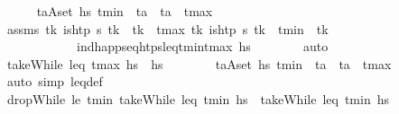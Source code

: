 \begin{isabellebody}
\isanewline
\ \ \ \ \isamarkupfalse%
\ {\isachardoublequoteopen}{\isasymforall}{\isacharparenleft}{\kern0pt}t\isactrlsub a{\isacharcomma}{\kern0pt}A{\isacharparenright}{\kern0pt}{\isasymin}set\ hs{\isachardot}{\kern0pt}\ t\isactrlsub m\isactrlsub i\isactrlsub n\ {\isasymle}\ t\isactrlsub a\ {\isasymand}\ t\isactrlsub a\ {\isasymle}\ t\isactrlsub m\isactrlsub a\isactrlsub x{\isachardoublequoteclose}\isanewline
\ \ \ \ \ \ \isamarkupfalse%
\ assms\ {\isacartoucheopen}{\isasymforall}t\isactrlsub k{\isachardot}{\kern0pt}\ is{\isacharunderscore}{\kern0pt}htp\ {\isasympi}s\ t\isactrlsub k\ {\isasymlongrightarrow}\ t\isactrlsub k\ {\isasymle}\ t\isactrlsub m\isactrlsub a\isactrlsub x{\isacartoucheclose}\ {\isacartoucheopen}{\isasymforall}t\isactrlsub k{\isachardot}{\kern0pt}\ is{\isacharunderscore}{\kern0pt}htp\ {\isasympi}s\ t\isactrlsub k\ {\isasymlongrightarrow}\ t\isactrlsub m\isactrlsub i\isactrlsub n\ {\isasymle}\ t\isactrlsub k{\isacartoucheclose}\ \isanewline
\ \ \ \ \ \ \ \ \ \ \ \ ind{\isacharunderscore}{\kern0pt}happ{\isacharunderscore}{\kern0pt}seq{\isacharunderscore}{\kern0pt}htps{\isacharunderscore}{\kern0pt}leq{\isacharunderscore}{\kern0pt}t\isactrlsub m\isactrlsub i\isactrlsub n{\isacharunderscore}{\kern0pt}t\isactrlsub m\isactrlsub a\isactrlsub x{\isacharbrackleft}{\kern0pt}\ hs{\isacharprime}{\kern0pt}{\isacharequal}{\kern0pt}{\isachardoublequoteopen}{\isacharbrackleft}{\kern0pt}{\isacharbrackright}{\kern0pt}{\isachardoublequoteclose}{\isacharbrackright}{\kern0pt}\isanewline
\ \ \ \ \ \ \isamarkupfalse%
\ auto\isanewline
\ \ \ \ \isanewline
\ \ \ \ \isamarkupfalse%
\ {\isachardoublequoteopen}takeWhile\ {\isacharparenleft}{\kern0pt}leq\ t\isactrlsub m\isactrlsub a\isactrlsub x{\isacharparenright}{\kern0pt}\ hs\ {\isacharequal}{\kern0pt}\ hs{\isachardoublequoteclose}\isanewline
\ \ \ \ \ \ \isamarkupfalse%
\ {\isacartoucheopen}{\isasymforall}{\isacharparenleft}{\kern0pt}t\isactrlsub a{\isacharcomma}{\kern0pt}A{\isacharparenright}{\kern0pt}{\isasymin}set\ hs{\isachardot}{\kern0pt}\ t\isactrlsub m\isactrlsub i\isactrlsub n\ {\isasymle}\ t\isactrlsub a\ {\isasymand}\ t\isactrlsub a\ {\isasymle}\ t\isactrlsub m\isactrlsub a\isactrlsub x{\isacartoucheclose}\ \isamarkupfalse%
\ {\isacharparenleft}{\kern0pt}auto\ simp{\isacharcolon}{\kern0pt}\ leq{\isacharunderscore}{\kern0pt}def{\isacharparenright}{\kern0pt}\isanewline
\ \ \ \ \isamarkupfalse%
\ {\isachardoublequoteopen}dropWhile\ {\isacharparenleft}{\kern0pt}le\ t\isactrlsub m\isactrlsub i\isactrlsub n{\isacharparenright}{\kern0pt}\ {\isacharparenleft}{\kern0pt}takeWhile\ {\isacharparenleft}{\kern0pt}leq\ t\isactrlsub m\isactrlsub i\isactrlsub n{\isacharparenright}{\kern0pt}\ hs{\isacharparenright}{\kern0pt}\ {\isacharequal}{\kern0pt}\ takeWhile\ {\isacharparenleft}{\kern0pt}leq\ t\isactrlsub m\isactrlsub i\isactrlsub n{\isacharparenright}{\kern0pt}\ hs{\isachardoublequoteclose}\isanewline

\end{isabellebody}
